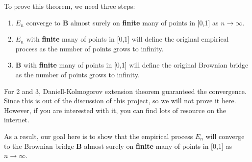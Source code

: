 \documentclass[final_project_1.tex]{subfiles}
\begin{document}
To prove this theorem, we need three steps:
\begin{enumerate}
\item $E_n$ converge to $\mathbf{B}$ almost surely on {\bf finite} many of points in [0,1] as $n\rightarrow \infty$.
\item $E_n$ with {\bf finite} many of points in [0,1] will define the original empirical process as the number of points grows to infinity.
\item $\mathbf{B}$ with {\bf finite} many of points in [0,1] will define the original Brownian bridge as the number of points grows to infinity.
\end{enumerate}

For 2 and 3, Daniell-Kolmogorov extension theorem guaranteed the convergence. Since this is out of the discussion of this project, so we will not prove it here. However, if you are interested with it, you can find lots of resource on the internet.

As a result, our goal here is to show that the empirical process $E_n$ will converge to the Brownian bridge $\mathbf{B}$ almost surely on {\bf finite} many of points in [0,1] as $n\rightarrow \infty$.
\end{document}
